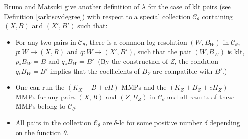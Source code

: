 \documentclass[11pt]{amsart}
\begin{document}
Bruno and Matsuki give another definition of $\lambda$ for the case of klt pairs (see Definition \ref{sarkisovdegree}) with respect to a special collection $\mathcal{C}_{\theta}$ containing $(X,B)$ and $(X',B')$ such that:
\begin{itemize}
  \item For any two pairs in $\mathcal{C}_{\theta}$, there is a common log resolution $(W,B_W)$ in $\mathcal{C}_\theta$, $p:W\to (X,B)$ and $q:W\to (X',B')$,  such that the pair $(W,B_W)$ is  klt, $p_*B_W=B$ and $q_*B_W=B'$. 
(By the construction of $Z$, the condition $q_*B_W = B'$ implies that the coefficients of $B_Z$ are compatible with $B'$.)
  \item One can run the $(K_X+B+cH)$-MMPs and the $(K_Z+B_Z+cH_Z)$-MMPs for any pairs $(X,B)$ and $(Z,B_Z)$ in $\mathcal{C}_{\theta}$ and  all results of these MMPs belong to $\mathcal{C}_{\theta}$;
  \item All pairs in  the collection $\mathcal{C}_{\theta}$ are $\delta$-lc for some positive number $\delta$ depending on the function $\theta$. 
\end{itemize}
\end{document}
